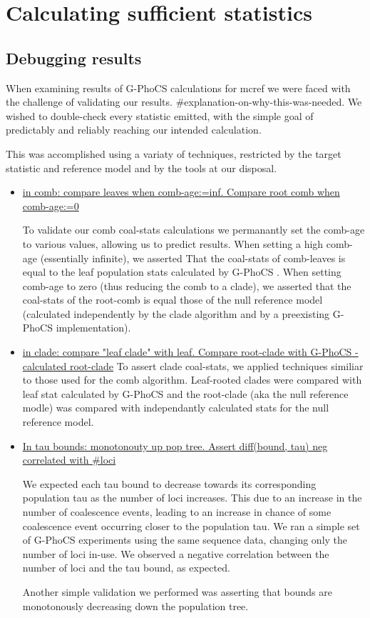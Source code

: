\documentclass[11pt]{article}
\newcommand{\1}{\mathbbm{1}}
\newcommand{\gp}{G-PhoCS }
\begin{document}
\section{Calculating sufficient statistics}


\subsection{Debugging results}

When examining results of \gp calculations for mcref we were faced with the challenge of validating our results. \#explanation-on-why-this-was-needed. We wished to double-check every statistic emitted, with the simple goal of predictably and reliably reaching our intended calculation.

This was accomplished using a variaty of techniques, restricted by the target statistic and reference model and by the tools at our disposal. 


\begin{itemize}

\item \underline{in comb: compare leaves when comb-age:=inf. Compare root comb when comb-age:=0}

To validate our comb coal-stats calculations we permanantly set the comb-age to various values, allowing us to predict results. When setting a high comb-age (essentially infinite), we asserted That the coal-stats of comb-leaves is equal to the leaf population stats calculated by \gp. When setting comb-age to zero (thus reducing the comb to a clade), we asserted that the coal-stats of the root-comb is equal those of the null reference model (calculated independently by the clade algorithm and by a preexisting \gp implementation).



\item \underline{in clade: compare "leaf clade" with leaf. Compare root-clade with \gp -calculated root-clade}
To assert clade coal-stats, we applied techniques similiar to those used for the comb algorithm. Leaf-rooted clades were compared with leaf stat calculated by \gp and the root-clade (aka the null reference modle) was compared with independantly calculated stats for the null reference model. 

\item \underline{In tau bounds: monotonouty up pop tree. Assert diff(bound, tau) neg correlated with \#loci}

We expected each tau bound to decrease towards its corresponding population tau as the number of loci increases. This due to an increase in the number of coalescence events, leading to an increase in chance of some coalescence event occurring closer to the population tau. We ran a simple set of \gp experiments using the same sequence data, changing only the number of loci in-use. We observed a negative correlation between the number of loci and the tau bound, as expected.

Another simple validation we performed was asserting that bounds are monotonously decreasing down the population tree.

\end{itemize}
\end{document}
